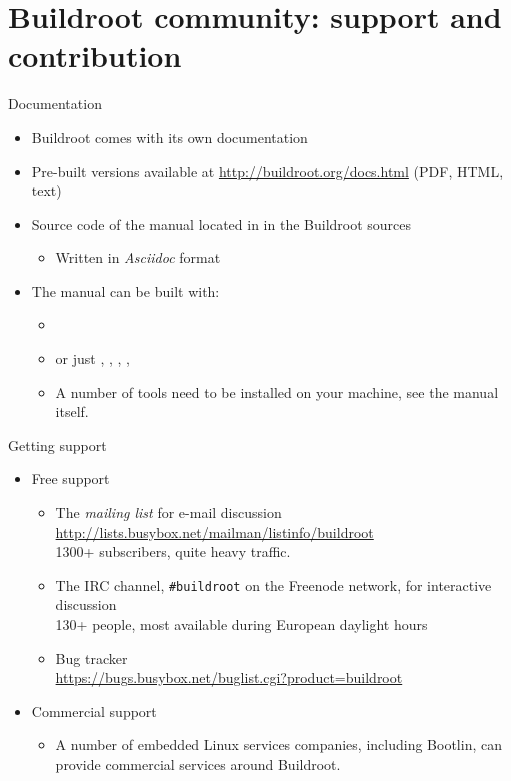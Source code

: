 \section{Buildroot community: support and contribution}

\begin{frame}{Documentation}
  \begin{itemize}
  \item Buildroot comes with its own documentation
  \item Pre-built versions available at
    \url{http://buildroot.org/docs.html} (PDF, HTML, text)
  \item Source code of the manual located in  in the
    Buildroot sources
    \begin{itemize}
    \item Written in {\em Asciidoc} format
    \end{itemize}
  \item The manual can be built with:
    \begin{itemize}
    \item {}
    \item or just , ,
      , , 
    \item A number of tools need to be installed on your machine,
      see the manual itself.
    \end{itemize}
  \end{itemize}
\end{frame}

\begin{frame}{Getting support}
  \begin{itemize}
  \item Free support
    \begin{itemize}
    \item The {\em mailing list} for e-mail discussion\\
      {\footnotesize \url{http://lists.busybox.net/mailman/listinfo/buildroot}}\\
      1300+ subscribers, quite heavy traffic.
    \item The IRC channel, {\tt \#buildroot} on the Freenode network,
      for interactive discussion\\
      130+ people, most available during European daylight hours
    \item Bug tracker\\
      \url{https://bugs.busybox.net/buglist.cgi?product=buildroot}
    \end{itemize}
  \item Commercial support
    \begin{itemize}
    \item A number of embedded Linux services companies, including
      Bootlin, can provide commercial services around
      Buildroot.
    \end{itemize}
  \end{itemize}
\end{frame}

